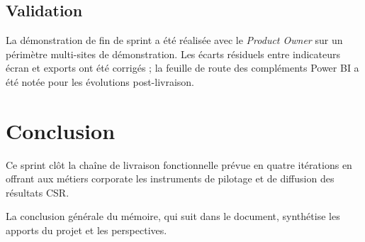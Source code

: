 \subsection{Validation}

La démonstration de fin de sprint a été réalisée avec le \emph{Product Owner} sur un périmètre multi-sites de démonstration. Les écarts résiduels entre indicateurs écran et exports ont été corrigés ; la feuille de route des compléments Power BI a été notée pour les évolutions post-livraison.

\section{Conclusion}

Ce sprint clôt la chaîne de livraison fonctionnelle prévue en quatre itérations en offrant aux métiers corporate les instruments de pilotage et de diffusion des résultats CSR.

La conclusion générale du mémoire, qui suit dans le document, synthétise les apports du projet et les perspectives.
